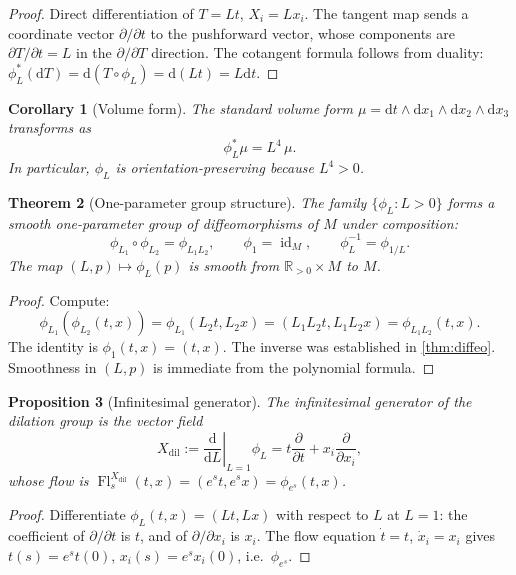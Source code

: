 \documentclass[11pt]{article}
\newtheorem{theorem}{Theorem}[section]
\newtheorem{proposition}[theorem]{Proposition}
\newtheorem{corollary}[theorem]{Corollary}
\theoremstyle{definition}
\theoremstyle{remark}
\newcommand{\R}{\mathbb{R}}
\newcommand{\diff}{\mathrm{d}}
\newcommand{\id}{\operatorname{id}}
\begin{document}
\begin{proof}
Direct differentiation of $T=Lt$, $X_i=Lx_i$.  The tangent map sends a
coordinate vector $\partial/\partial t$ to the pushforward vector, whose
components are $\partial T/\partial t=L$ in the $\partial/\partial T$
direction.  The cotangent formula follows from duality:
$\phi_L^*(\diff T)=\diff(T\circ\phi_L)=\diff(Lt)=L\diff t$.
\end{proof}

\begin{corollary}[Volume form]
The standard volume form $\mu=\diff t\wedge\diff x_1\wedge\diff x_2\wedge
\diff x_3$ transforms as
\[
\phi_L^*\mu=L^4\,\mu.
\]
In particular, $\phi_L$ is orientation-preserving because $L^4>0$.
\end{corollary}

\begin{theorem}[One-parameter group structure]
\label{thm:group}
The family $\{\phi_L:L>0\}$ forms a smooth one-parameter group of
diffeomorphisms of $M$ under composition:
\[
\phi_{L_1}\circ\phi_{L_2}=\phi_{L_1L_2},\qquad
\phi_1=\id_M,\qquad
\phi_L^{-1}=\phi_{1/L}.
\]
The map $(L,p)\mapsto\phi_L(p)$ is smooth from $\R_{>0}\times M$ to $M$.
\end{theorem}

\begin{proof}
Compute:
\[
\phi_{L_1}(\phi_{L_2}(t,x))=\phi_{L_1}(L_2t,L_2x)
=(L_1L_2t,L_1L_2x)=\phi_{L_1L_2}(t,x).
\]
The identity is $\phi_1(t,x)=(t,x)$.  The inverse was established in
\ref{thm:diffeo}.  Smoothness in $(L,p)$ is immediate from the polynomial
formula.
\end{proof}

\begin{proposition}[Infinitesimal generator]
The infinitesimal generator of the dilation group is the vector field
\[
X_{\mathrm{dil}}:=\left.\frac{\diff}{\diff L}\right|_{L=1}\phi_L
=t\frac{\partial}{\partial t}+x_i\frac{\partial}{\partial x_i},
\]
whose flow is $\operatorname{Fl}^{X_{\mathrm{dil}}}_s(t,x)=(e^s t,e^s x)
=\phi_{e^s}(t,x)$.
\end{proposition}

\begin{proof}
Differentiate $\phi_L(t,x)=(Lt,Lx)$ with respect to $L$ at $L=1$: the
coefficient of $\partial/\partial t$ is $t$, and of $\partial/\partial x_i$
is $x_i$.  The flow equation $\dot t=t$, $\dot x_i=x_i$ gives
$t(s)=e^s t(0)$, $x_i(s)=e^s x_i(0)$, i.e.\ $\phi_{e^s}$.
\end{proof}
\end{document}
